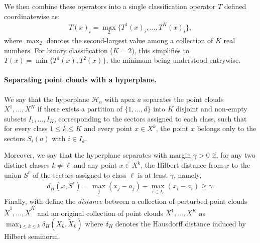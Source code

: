 \documentclass{article}
\renewcommand{\geq}{\geqslant}
\renewcommand{\leq}{\leqslant}
\begin{document}
We then combine these operators into a single classification operator $T$ defined coordinatewise as:
\begin{align}
  T(x)_i = \operatorname{\max}_2\{T^1(x)_i, \dots, T^K(x)_i\}\label{eq:single_operator},
\end{align}
where $\operatorname{\max}_2$ denotes the second-largest value among a collection of $K$ real numbers. For binary classification ($K=2$), this simplifies to $T(x)=\min\{T^1(x), T^2(x)\}$, the minimum being understood entrywise.

\paragraph{Separating point clouds with a hyperplane.}

We say that the hyperplane $\mathcal{H}_a$ with apex $a$ separates the point clouds $X^1, \ldots, X^K$ if there exists a partition of $\{1, \ldots, d\}$ into $K$ disjoint and non-empty subsets $I_1, \ldots, I_K$, corresponding to the sectors assigned to each class, such that for every class $1 \leq k \leq K$ and every point $x \in X^k$, the point $x$ belongs only to the sectors $S_i(a)$ with $i \in I_k$. 

Moreover, we say that the hyperplane separates with margin $\gamma > 0$ if, for any two distinct classes $k \neq \ell$ and any point $x \in X^k$, the Hilbert distance from $x$ to the union $S^\ell$ of the sectors assigned to class $\ell$ is at least $\gamma$, namely,
\begin{align}
d_H(x, S^\ell) = \max_j(x_j - a_j) - \max_{i \in I_\ell}(x_i - a_i) \geq \gamma.
\end{align}
Finally, with define the {\em distance} between a collection of perturbed point clouds $\tilde{X}^1,\dots, \tilde{X}^K$ and an original collection of point clouds $X^1,\dots,X^K$ as $\max_{1\leq k\leq k} \delta_H(X_k,\tilde{X}_k)$ where $\delta_H$ denotes the Hausdorff distance induced by Hilbert seminorm.
\end{document}
